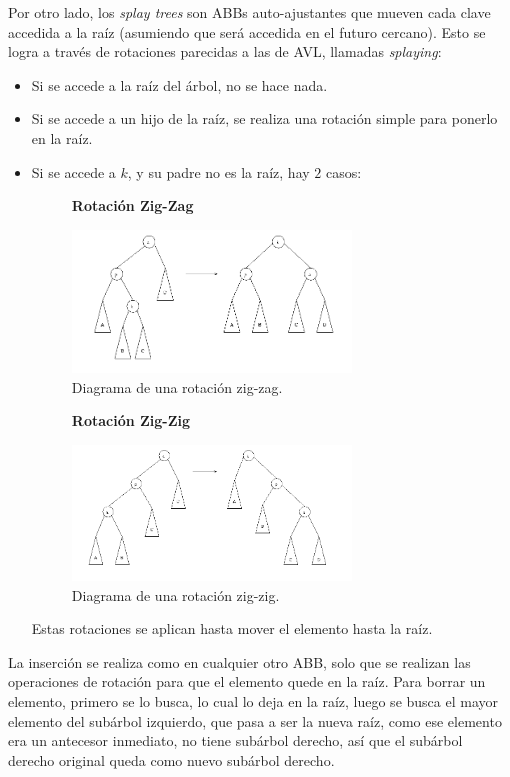 \documentclass{article}
\begin{document}
Por otro lado, los \textit{splay trees} son ABBs auto-ajustantes que mueven cada clave accedida a la raíz (asumiendo que será accedida en el futuro cercano). Esto se logra a través de rotaciones parecidas a las de AVL, llamadas \textit{splaying}:
\begin{itemize}
    \item Si se accede a la raíz del árbol, no se hace nada.
    \item Si se accede a un hijo de la raíz, se realiza una rotación simple para ponerlo en la raíz.
    \item Si se accede a $k$, y su padre no es la raíz, hay $2$ casos:
        \begin{figure}[H]
            \centering
            \textbf{Rotación Zig-Zag}\par\medskip
            \includegraphics[width=0.7\textwidth]{rotacion_zig_zag.png}
            \caption*{Diagrama de una rotación zig-zag.}
        \end{figure}
        \begin{figure}[H]
            \centering
            \textbf{Rotación Zig-Zig}\par\medskip
            \includegraphics[width=0.7\textwidth]{rotacion_zig_zig.png}
            \caption*{Diagrama de una rotación zig-zig.}
        \end{figure}
        Estas rotaciones se aplican hasta mover el elemento hasta la raíz.
\end{itemize}

La inserción se realiza como en cualquier otro ABB, solo que se realizan las operaciones de rotación para que el elemento quede en la raíz. Para borrar un elemento, primero se lo busca, lo cual lo deja en la raíz, luego se busca el mayor elemento del subárbol izquierdo, que pasa a ser la nueva raíz, como ese elemento era un antecesor inmediato, no tiene subárbol derecho, así que el subárbol derecho original queda como nuevo subárbol derecho.
\end{document}

